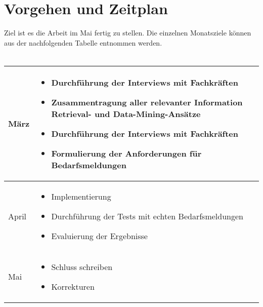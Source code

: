 \documentclass[a4paper,12pt]{scrreprt}
\newcommand{\hiddenchapter}[1]{
	\chapter*{{#1}}
}
\begin{document}
\hiddenchapter{Vorgehen und Zeitplan}
Ziel ist es die Arbeit im Mai fertig zu stellen. Die einzelnen Monatsziele können aus der nachfolgenden Tabelle entnommen werden. \\ \\
\begin{tabularx}{1\textwidth} { 
		| >{\raggedright\arraybackslash}X 
		| >{\raggedright\arraybackslash}X | }
	\hline
	März
	& \begin{itemize}
		\item Durchführung der Interviews mit Fachkräften
		\item Zusammentragung aller relevanter Information Retrieval- und Data-Mining-Ansätze
		\item Durchführung der Interviews mit Fachkräften
		\item Formulierung der Anforderungen für Bedarfsmeldungen
	\end{itemize}\\
	\hline
	April
	& \begin{itemize}
		\item Implementierung
		\item Durchführung der Tests mit echten Bedarfsmeldungen
		\item Evaluierung der Ergebnisse
	\end{itemize}\\
	\hline
	Mai
	& \begin{itemize}
		\item Schluss schreiben
		\item Korrekturen
	\end{itemize}\\
	\hline
\end{tabularx}
\newpage

\renewcommand\contentsname{Aufbau der Arbeit}
\tableofcontents

\newpage

\setcounter{page}{1}
\pagestyle{fancy}
\setcounter{chapter}{0}











%







%
%
\raggedright
\printbibliography
\end{document}
